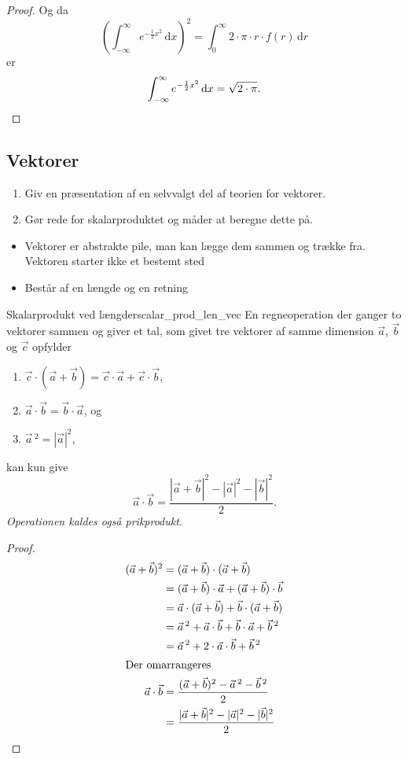 \documentclass{article}
\newcommand\ud{\,\mathrm{d}}
\begin{document}
\begin{proof}
	Og da 
	\[
		\left(\int_{-\infty}^\infty e^{-\frac{1}{2}x^2} \ud x\right)^2 = \int_0^\infty 2 \cdot \pi \cdot r \cdot f(r) \ud r
	\] 
	er 
	\[
		\int_{-\infty}^\infty e^{-\frac{1}{2}x^2} \ud x = \sqrt{2 \cdot \pi}.\qedhere
	\] 
\end{proof}

\begin{tcolorbox}
	\section{Vektorer}
	\tcblower
	\begin{enumerate}
		\item Giv en præsentation af en selvvalgt del af teorien for vektorer.
		\item Gør rede for skalarproduktet og måder at beregne dette på.
	\end{enumerate}
\end{tcolorbox}

\begin{itemize}
	\item Vektorer er abstrakte pile, man kan lægge dem sammen og trække fra.
		Vektoren starter ikke et bestemt sted
	\item Består af en længde og en retning
\end{itemize}
\begin{theorem}{Skalarprodukt ved længder}{scalar_prod_len_vec}
	En regneoperation der ganger to vektorer sammen og giver et tal, som givet
	tre vektorer af samme dimension $\vec{a}$, $\vec{b}$ og $\vec{c}$ opfylder
	\begin{enumerate}
		\item $\vec{c} \cdot (\vec{a} + \vec{b}) = \vec{c} \cdot \vec{a} + \vec{c} \cdot \vec{b}$,
		\item $\vec{a} \cdot \vec{b} = \vec{b} \cdot \vec{a}$, og
		\item $\vec{a}\,^2 = |\vec{a}|^2$,
	\end{enumerate}
	kan kun give
	\[
		\vec{a} \cdot \vec{b} = \frac{|\vec{a} + \vec{b}|^2 - |\vec{a}|^2 - |\vec{b}|^2}{2}.
	\] 
	\textit{Operationen kaldes også prikprodukt}.
\end{theorem}
\begin{proof}
\begin{align*}
	(\vec{a} + \vec{b})^2 &= (\vec{a} + \vec{b}) \cdot (\vec{a} + \vec{b})\\
						  &= (\vec{a} + \vec{b}) \cdot \vec{a} + (\vec{a} + \vec{b}) \cdot \vec{b}\\
						  &= \vec{a} \cdot (\vec{a} + \vec{b}) + \vec{b} \cdot (\vec{a} + \vec{b})\\
						  &= \vec{a}\,^2 + \vec{a} \cdot \vec{b} + \vec{b} \cdot \vec{a} + \vec{b}\,^2\\
						  &= \vec{a}\,^2 + 2 \cdot \vec{a} \cdot \vec{b} + \vec{b}\,^2\\
						  \intertext{Der omarrangeres}
	\vec{a} \cdot \vec{b} &= \frac{(\vec{a} + \vec{b})^2 - \vec{a}\,^2 - \vec{b}\,^2}{2}\\
						  &= \frac{|\vec{a} + \vec{b}|^2 - |\vec{a}|^2 - |\vec{b}|^2}{2}\qedhere
\end{align*}
\end{proof}
\end{document}
